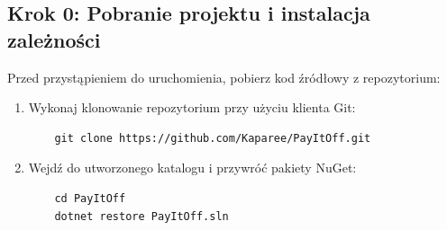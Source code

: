\documentclass[12pt, a4paper]{article}
\begin{document}
\subsection{Krok 0: Pobranie projektu i instalacja zależności}
Przed przystąpieniem do uruchomienia, pobierz kod źródłowy z repozytorium:
\begin{enumerate}
    \item Wykonaj klonowanie repozytorium przy użyciu klienta Git:
    \begin{verbatim}
    git clone https://github.com/Kaparee/PayItOff.git
    \end{verbatim}
    \item Wejdź do utworzonego katalogu i przywróć pakiety NuGet:
    \begin{verbatim}
    cd PayItOff
    dotnet restore PayItOff.sln
    \end{verbatim}
\end{enumerate}
\end{document}
